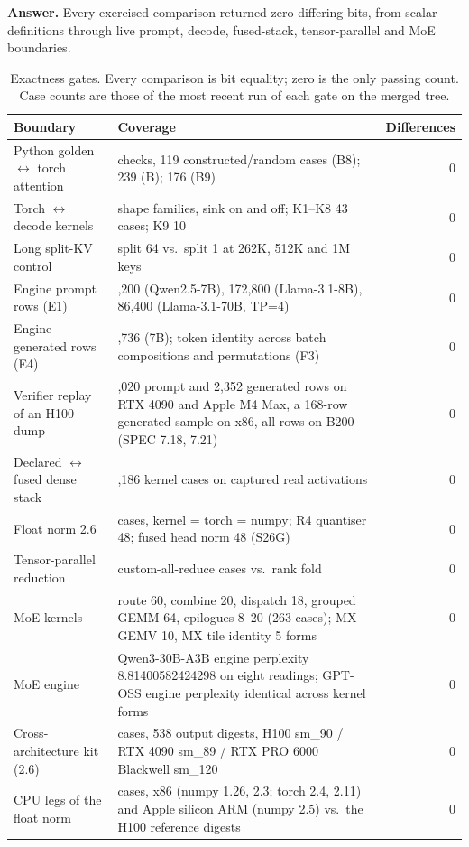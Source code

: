 \documentclass{article}
\begin{document}
\textbf{Answer.}  Every exercised comparison returned zero differing bits, from scalar
definitions through live prompt, decode, fused-stack, tensor-parallel and MoE boundaries.

\begin{table}[H]
\centering
\small
\begin{tabular}{>{\raggedright\arraybackslash}p{}>{\raggedright\arraybackslash}p{}r}
\toprule
Boundary & Coverage & Differences \\
\midrule
Python golden $\leftrightarrow$ torch attention & 28 checks, 119 constructed/random cases (B8); 239 (B); 176 (B9) & 0 \\
Torch $\leftrightarrow$ decode kernels & 21 shape families, sink on and off; K1--K8 43 cases; K9 10 & 0 \\
Long split-KV control & split 64 vs.\ split 1 at 262K, 512K and 1M keys & 0 \\
Engine prompt rows (E1) & 151,200 (Qwen2.5-7B), 172,800 (Llama-3.1-8B), 86,400 (Llama-3.1-70B, TP=4) & 0 \\
Engine generated rows (E4) & 29,736 (7B); token identity across batch compositions and permutations (F3) & 0 \\
Verifier replay of an H100 dump & 370,020 prompt and 2,352 generated rows on RTX 4090 and Apple M4 Max, a 168-row generated sample on x86, all rows on B200 (SPEC 7.18, 7.21) & 0 \\
Declared $\leftrightarrow$ fused dense stack & 1,186 kernel cases on captured real activations & 0 \\
Float norm 2.6 & 160 cases, kernel = torch = numpy; R4 quantiser 48; fused head norm 48 (S26G) & 0 \\
Tensor-parallel reduction & 32 custom-all-reduce cases vs.\ rank fold & 0 \\
MoE kernels & route 60, combine 20, dispatch 18, grouped GEMM 64, epilogues 8--20 (263 cases); MX GEMV 10, MX tile identity 5 forms & 0 \\
MoE engine & Qwen3-30B-A3B engine perplexity 8.81400582424298 on eight readings; GPT-OSS engine perplexity identical across kernel forms & 0 \\
Cross-architecture kit (2.6) & 158 cases, 538 output digests, H100 sm\_90 / RTX 4090 sm\_89 / RTX PRO 6000 Blackwell sm\_120 & 0 \\
CPU legs of the float norm & 72 cases, x86 (numpy 1.26, 2.3; torch 2.4, 2.11) and Apple silicon ARM (numpy 2.5) vs.\ the H100 reference digests & 0 \\
\bottomrule
\end{tabular}
\caption{Exactness gates.  Every comparison is bit equality; zero is the only passing
count.  Case counts are those of the most recent run of each gate on the merged tree.}
\label{tab:exactness}
\end{table}
\FloatBarrier
\end{document}
